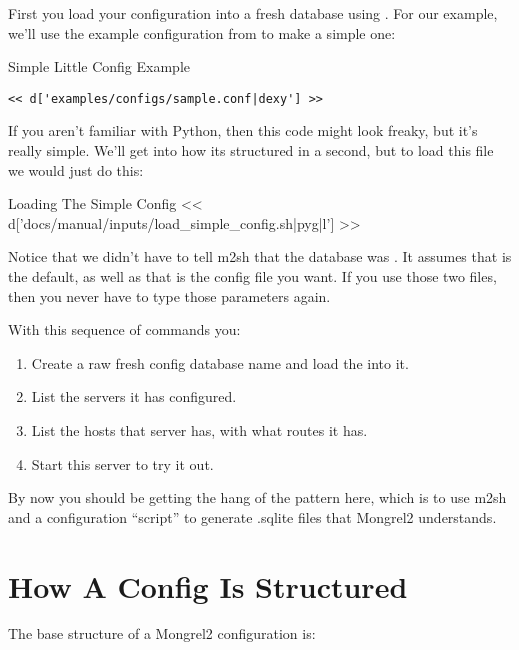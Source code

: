 First you load your configuration into a fresh database using .  For our example, we'll use the example configuration from
 to make a simple one:

\begin{code}{Simple Little Config Example}
\begin{lstlisting}
<< d['examples/configs/sample.conf|dexy'] >>
\end{lstlisting}
\end{code}

If you aren't familiar with Python, then this code might look freaky, but it's really
simple.  We'll get into how its structured in a second, but to load this file
we would just do this:

\begin{code}{Loading The Simple Config}
<< d['docs/manual/inputs/load_simple_config.sh|pyg|l'] >>
\end{code}

Notice that we didn't have to tell m2sh that the database was .
It assumes that is the default, as well as that  is the config
file you want.  If you use those two files, then you never have to type those
parameters again.

With this sequence of commands you:

\begin{enumerate}
\item Create a raw fresh config database name  and load the  into it.
\item List the servers it has configured.
\item List the hosts that server has, with what routes it has.
\item Start this server to try it out.
\end{enumerate}

By now you should be getting the hang of the pattern here, which is to use
m2sh and a configuration ``script'' to generate .sqlite files
that Mongrel2 understands.

\section{How A Config Is Structured}

The base structure of a Mongrel2 configuration is:

